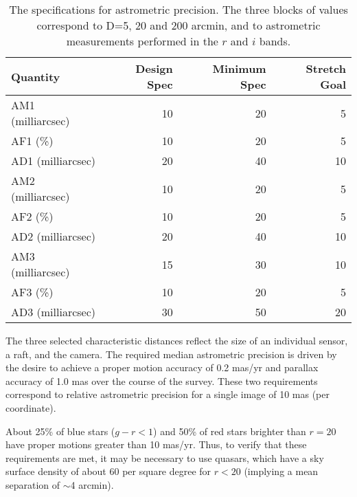 \begin{table}[h]
\begin{tabular}{|l|r|r|r|}
\hline
Quantity   & Design Spec & Minimum Spec & Stretch Goal     \\
\hline
    AM1 (milliarcsec)  &    10      &        20    &        5         \\
    AF1 (\%)          &    10      &        20    &        5         \\
    AD1 (milliarcsec)  &    20      &        40   &        10         \\
\hline
    AM2 (milliarcsec)  &    10      &        20    &        5         \\
    AF2 (\%)          &    10      &        20    &        5         \\
    AD2 (milliarcsec)  &    20      &        40   &        10         \\
\hline
    AM3 (milliarcsec)  &    15      &        30    &       10         \\
    AF3 (\%)          &    10      &        20    &        5         \\
    AD3 (milliarcsec)  &    30      &        50   &        20         \\
\hline
\end{tabular}
\caption{The specifications for astrometric precision. The three blocks
of values correspond to D=5, 20 and 200 arcmin, and
to astrometric measurements performed in the $r$ and $i$ bands.}
\label{TastroRel}
\end{table}

The three selected characteristic distances reflect the size of an
individual sensor, a
raft, and the camera. The required median astrometric precision is driven by
the desire to achieve a proper motion accuracy of 0.2 mas/yr and parallax
accuracy of 1.0 mas over the course of the survey. These two requirements
correspond to relative astrometric precision for a single image of 10 mas
(per coordinate).

About 25\% of blue stars ($g-r<1$) and 50\% of
red stars brighter than $r=20$ have proper motions greater than 10
mas/yr. Thus, to verify that these requirements are met, it may be
necessary to use quasars, which have a sky surface density of about 60 per
square degree for $r<20$ (implying a mean separation of $\sim$4 arcmin).

